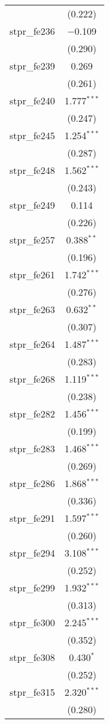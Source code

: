 \begin{table}[!htbp]
\begin{tabular}{@{\extracolsep{5pt}}lc}
  & (0.222) \\ 
  stpr\_fe236 & $-$0.109 \\ 
  & (0.290) \\ 
  stpr\_fe239 & 0.269 \\ 
  & (0.261) \\ 
  stpr\_fe240 & 1.777$^{***}$ \\ 
  & (0.247) \\ 
  stpr\_fe245 & 1.254$^{***}$ \\ 
  & (0.287) \\ 
  stpr\_fe248 & 1.562$^{***}$ \\ 
  & (0.243) \\ 
  stpr\_fe249 & 0.114 \\ 
  & (0.226) \\ 
  stpr\_fe257 & 0.388$^{**}$ \\ 
  & (0.196) \\ 
  stpr\_fe261 & 1.742$^{***}$ \\ 
  & (0.276) \\ 
  stpr\_fe263 & 0.632$^{**}$ \\ 
  & (0.307) \\ 
  stpr\_fe264 & 1.487$^{***}$ \\ 
  & (0.283) \\ 
  stpr\_fe268 & 1.119$^{***}$ \\ 
  & (0.238) \\ 
  stpr\_fe282 & 1.456$^{***}$ \\ 
  & (0.199) \\ 
  stpr\_fe283 & 1.468$^{***}$ \\ 
  & (0.269) \\ 
  stpr\_fe286 & 1.868$^{***}$ \\ 
  & (0.336) \\ 
  stpr\_fe291 & 1.597$^{***}$ \\ 
  & (0.260) \\ 
  stpr\_fe294 & 3.108$^{***}$ \\ 
  & (0.252) \\ 
  stpr\_fe299 & 1.932$^{***}$ \\ 
  & (0.313) \\ 
  stpr\_fe300 & 2.245$^{***}$ \\ 
  & (0.352) \\ 
  stpr\_fe308 & 0.430$^{*}$ \\ 
  & (0.252) \\ 
  stpr\_fe315 & 2.320$^{***}$ \\ 
  & (0.280) \\ 

\end{tabular}
\end{table}

